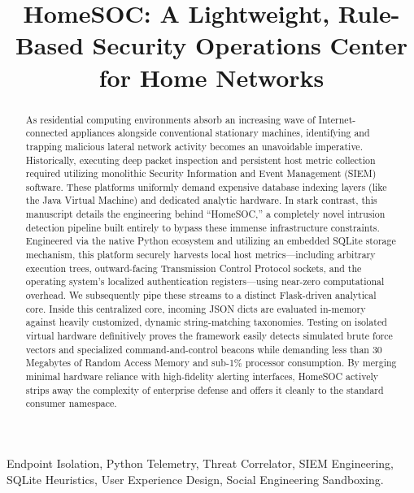 \documentclass[conference]{IEEEtran}
\begin{document}
\title{HomeSOC: A Lightweight, Rule-Based Security Operations Center for Home Networks}

\author{
}

\maketitle

\begin{abstract}
As residential computing environments absorb an increasing wave of Internet-connected appliances alongside conventional stationary machines, identifying and trapping malicious lateral network activity becomes an unavoidable imperative. Historically, executing deep packet inspection and persistent host metric collection required utilizing monolithic Security Information and Event Management (SIEM) software. These platforms uniformly demand expensive database indexing layers (like the Java Virtual Machine) and dedicated analytic hardware. In stark contrast, this manuscript details the engineering behind ``HomeSOC,'' a completely novel intrusion detection pipeline built entirely to bypass these immense infrastructure constraints. Engineered via the native Python ecosystem and utilizing an embedded SQLite storage mechanism, this platform securely harvests local host metrics—including arbitrary execution trees, outward-facing Transmission Control Protocol sockets, and the operating system's localized authentication registers—using near-zero computational overhead. We subsequently pipe these streams to a distinct Flask-driven analytical core. Inside this centralized core, incoming JSON dicts are evaluated in-memory against heavily customized, dynamic string-matching taxonomies. Testing on isolated virtual hardware definitively proves the framework easily detects simulated brute force vectors and specialized command-and-control beacons while demanding less than 30 Megabytes of Random Access Memory and sub-1\% processor consumption. By merging minimal hardware reliance with high-fidelity alerting interfaces, HomeSOC actively strips away the complexity of enterprise defense and offers it cleanly to the standard consumer namespace.
\end{abstract}

\begin{IEEEkeywords}
Endpoint Isolation, Python Telemetry, Threat Correlator, SIEM Engineering, SQLite Heuristics, User Experience Design, Social Engineering Sandboxing.
\end{IEEEkeywords}
\end{document}
